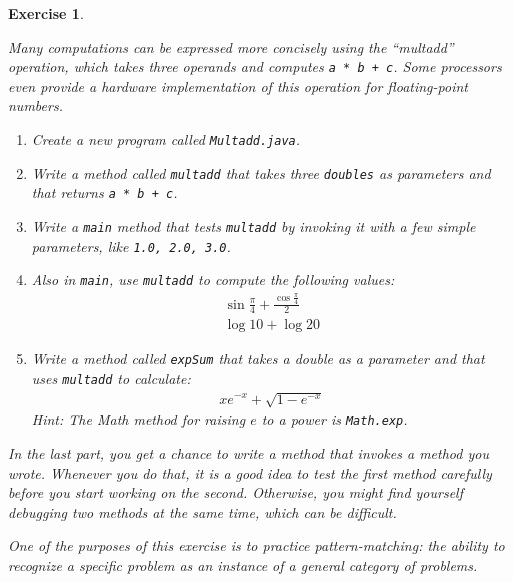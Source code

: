 \documentclass[12pt]{book}
\theoremstyle{exercise}
\newtheorem{exercise}{Exercise}[chapter]
\newcommand{\java}[1]{\verb"#1"}
\newcommand{\java}[1]{\lstinline{#1}} %
\begin{document}
\begin{exercise}
\label{ex.multadd}

Many computations can be expressed more concisely using the ``multadd'' operation, which takes three operands and computes \java{a * b + c}.
Some processors even provide a hardware implementation of this operation for floating-point numbers.

\begin{enumerate}

\item Create a new program called {\tt Multadd.java}.

\item Write a method called \java{multadd} that takes three \java{doubles} as parameters and that returns \java{a * b + c}.

\item Write a \java{main} method that tests \java{multadd} by invoking it with a few simple parameters, like \java{1.0, 2.0, 3.0}.

\item Also in \java{main}, use \java{multadd} to compute the following values:
%
\begin{eqnarray*}
& \sin \frac{\pi}{4} + \frac{\cos \frac{\pi}{4}}{2} & \\
& \log 10 + \log 20 &
\end{eqnarray*}

\item Write a method called \java{expSum} that takes a double as a parameter and that uses \java{multadd} to calculate:
%
\begin{eqnarray*}
x e^{-x} + \sqrt{1 - e^{-x}}
\end{eqnarray*}
%
Hint: The Math method for raising $e$ to a power is \java{Math.exp}.

\end{enumerate}

In the last part, you get a chance to write a method that invokes a method you wrote.
Whenever you do that, it is a good idea to test the first method carefully before you start working on the second.
Otherwise, you might find yourself debugging two methods at the same time, which can be difficult.

One of the purposes of this exercise is to practice pattern-matching: the ability to recognize a specific problem as an instance of a general category of problems.

\end{exercise}
\end{document}
